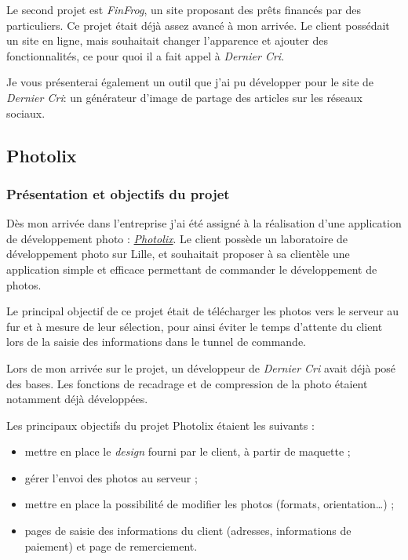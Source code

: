 \bigskip

Le second projet est \emph{FinFrog}, un site proposant des prêts
financés par des particuliers. Ce projet était déjà assez avancé à mon
arrivée. Le client possédait un site en ligne, mais souhaitait changer
l'apparence et ajouter des fonctionnalités, ce pour quoi il a fait appel
à \emph{Dernier Cri}.

\bigskip

Je vous présenterai également un outil que j'ai pu développer pour le
site de \emph{Dernier Cri}: un générateur d'image de partage des
articles sur les réseaux sociaux.

\bigskip

\subsection{Photolix}\label{photolix}

\subsubsection{Présentation et objectifs du
projet}\label{pruxe9sentation-et-objectifs-du-projet}

\bigskip

Dès mon arrivée dans l'entreprise j'ai été assigné à la réalisation
d'une application de développement photo :
\href{https://app.photolix.fr/}{\emph{Photolix}}. Le client possède un
laboratoire de développement photo sur Lille, et souhaitait proposer à
sa clientèle une application simple et efficace permettant de commander
le développement de photos.

\bigskip

Le principal objectif de ce projet était de télécharger les photos vers
le serveur au fur et à mesure de leur sélection, pour ainsi éviter le
temps d'attente du client lors de la saisie des informations dans le
tunnel de commande.

\bigskip

Lors de mon arrivée sur le projet, un développeur de \emph{Dernier Cri}
avait déjà posé des bases. Les fonctions de recadrage et de compression
de la photo étaient notamment déjà développées.

\bigskip

Les principaux objectifs du projet Photolix étaient les suivants :

\begin{itemize}
\tightlist
\item
  mettre en place le \emph{design} fourni par le client, à partir de
  maquette ;
\item
  gérer l'envoi des photos au serveur ;
\item
  mettre en place la possibilité de modifier les photos (formats,
  orientation\ldots{}) ;
\item
  pages de saisie des informations du client (adresses, informations de
  paiement) et page de remerciement.
\end{itemize}

